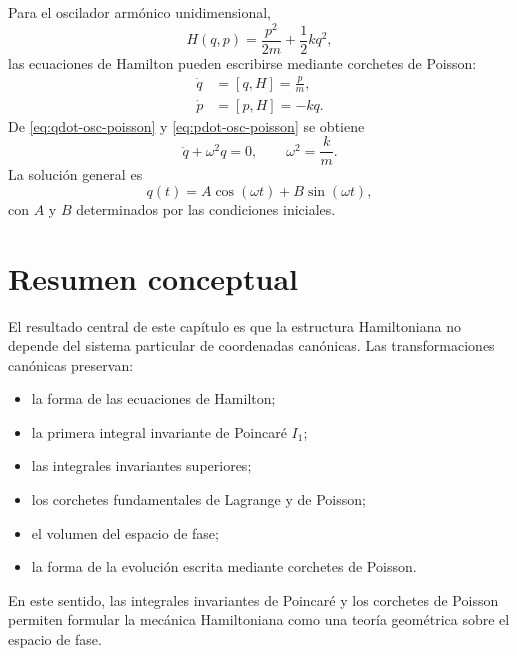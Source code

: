 \documentclass[../apunte_mecanica_clasica.tex]{subfiles}
\begin{document}
Para el oscilador armónico unidimensional,
\begin{equation}
    H(q,p)=\frac{p^2}{2m}+\frac{1}{2}kq^2,
    \label{eq:hamiltoniano-oscilador-ii}
\end{equation}
las ecuaciones de Hamilton pueden escribirse mediante corchetes de Poisson:
\begin{align}
    \dot q &= [q,H]=\frac{p}{m},
    \label{eq:qdot-osc-poisson} \\
    \dot p &= [p,H]=-kq.
    \label{eq:pdot-osc-poisson}
\end{align}
De \eqref{eq:qdot-osc-poisson} y \eqref{eq:pdot-osc-poisson} se obtiene
\begin{equation}
    \ddot q + \omega^2 q =0,
    \qquad
    \omega^2=\frac{k}{m}.
    \label{eq:edo-oscilador-poisson}
\end{equation}
La solución general es
\begin{equation}
    q(t)=A\cos(\omega t)+B\sin(\omega t),
    \label{eq:sol-oscilador-q}
\end{equation}
con $A$ y $B$ determinados por las condiciones iniciales.

\section{Resumen conceptual}

El resultado central de este capítulo es que la estructura Hamiltoniana no depende del sistema particular de coordenadas canónicas. Las transformaciones canónicas preservan:

\begin{itemize}
    \item la forma de las ecuaciones de Hamilton;
    \item la primera integral invariante de Poincaré $I_1$;
    \item las integrales invariantes superiores;
    \item los corchetes fundamentales de Lagrange y de Poisson;
    \item el volumen del espacio de fase;
    \item la forma de la evolución escrita mediante corchetes de Poisson.
\end{itemize}

En este sentido, las integrales invariantes de Poincaré y los corchetes de Poisson permiten formular la mecánica Hamiltoniana como una teoría geométrica sobre el espacio de fase.
\end{document}
